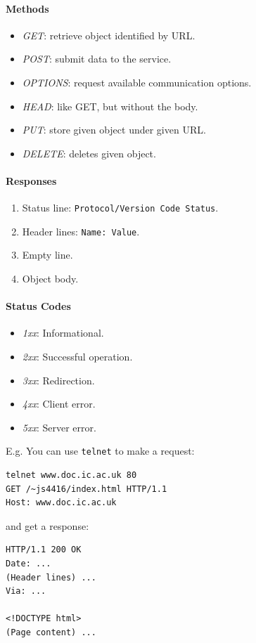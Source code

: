 \documentclass[twocolumn,english]{article}
\begin{document}
\paragraph{Methods}
\begin{itemize}
\item \emph{GET}: retrieve object identified by URL.
\item \emph{POST}: submit data to the service.
\item \emph{OPTIONS}: request available communication options.
\item \emph{HEAD}: like GET, but without the body.
\item \emph{PUT}: store given object under given URL.
\item \emph{DELETE}: deletes given object.
\end{itemize}

\paragraph{Responses}
\begin{enumerate}
\item Status line: \texttt{Protocol/Version Code Status}.
\item Header lines: \texttt{Name: Value}.
\item Empty line.
\item Object body.
\end{enumerate}

\paragraph{Status Codes}
\begin{itemize}
\item \emph{1xx}: Informational.
\item \emph{2xx}: Successful operation.
\item \emph{3xx}: Redirection.
\item \emph{4xx}: Client error.
\item \emph{5xx}: Server error.
\end{itemize}
E.g. You can use \texttt{telnet} to make a request:

\begin{lstlisting}
telnet www.doc.ic.ac.uk 80
GET /~js4416/index.html HTTP/1.1
Host: www.doc.ic.ac.uk
\end{lstlisting}

and get a response:

\begin{lstlisting}
HTTP/1.1 200 OK
Date: ...
(Header lines) ...
Via: ...

<!DOCTYPE html>
(Page content) ...
\end{lstlisting}
\end{document}
